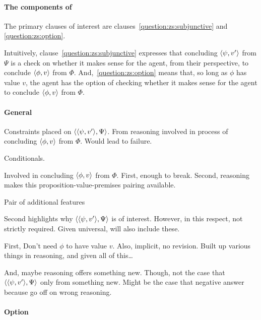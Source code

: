 \paragraph{The components of \qzS{}}

\begin{note}
  The primary clauses of interest are clauses~\ref{question:zs:subjunctive} and \ref{question:zs:option}.

  Intuitively, clause~\ref{question:zs:subjunctive} expresses that concluding \(\langle \psi, v' \rangle\) from \(\Psi\) is a check on whether it makes sense for the agent, from their perspective, to conclude \(\langle \phi, v \rangle\) from \(\Phi\).
  And,~\ref{question:zs:option} means that, so long as \(\phi\) has value \(v\), the agent has the option of checking whether it makes sense for the agent to conclude \(\langle \phi, v \rangle\) from \(\Phi\).
\end{note}

\paragraph{General}

\begin{note}
  Constraints placed on \(\langle \langle \psi, v' \rangle, \Psi \rangle\).
  From reasoning involved in process of concluding \(\langle \phi, v \rangle\) from \(\Phi\).
  Would lead to failure.

  Conditionals.

  Involved in concluding \(\langle \phi, v \rangle\) from \(\Phi\).
  First, enough to break.
  Second, reasoning makes this proposition-value-premises pairing available.

  Pair of additional features

  Second highlights why \(\langle \langle \psi, v' \rangle, \Psi \rangle\) is of interest.
  However, in this respect, not strictly required.
  Given universal, will also include these.

  First,
  Don't need \(\phi\) to have value \(v\).
  Also, implicit, no revision.
  Built up various things in reasoning, and given all of this\dots


  And, maybe reasoning offers something new.
  Though, not the case that \(\langle \langle \psi, v' \rangle, \Psi \rangle\) only from something new.
  Might be the case that negative answer because go off on wrong reasoning.
\end{note}

\paragraph{Option}

